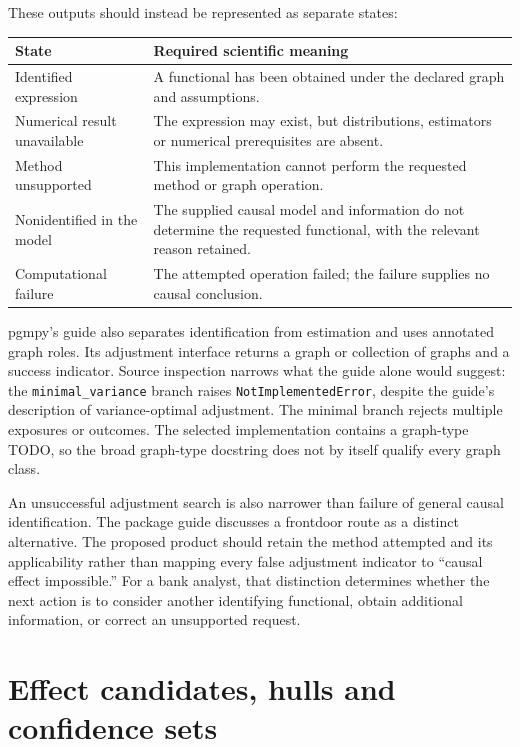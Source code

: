 These outputs should instead be represented as separate states:
\begin{center}
\begin{tabular}{p{}p{}}
\toprule
State & Required scientific meaning\\
\midrule
Identified expression & A functional has been obtained under the declared graph and assumptions.\\
Numerical result unavailable & The expression may exist, but distributions, estimators or numerical prerequisites are absent.\\
Method unsupported & This implementation cannot perform the requested method or graph operation.\\
Nonidentified in the model & The supplied causal model and information do not determine the requested functional, with the relevant reason retained.\\
Computational failure & The attempted operation failed; the failure supplies no causal conclusion.\\
\bottomrule
\end{tabular}
\end{center}

pgmpy's guide also separates identification from estimation and uses annotated
graph roles. Its adjustment interface returns a graph or collection of graphs
and a success indicator. Source inspection narrows what the guide alone would
suggest: the \texttt{minimal\_variance} branch raises
\texttt{NotImplementedError}, despite the guide's description of variance-optimal
adjustment. The minimal branch rejects multiple exposures or outcomes. The
selected implementation contains a graph-type TODO, so the broad graph-type
docstring does not by itself qualify every graph class. \citep{v12_sw_pgmpy}

An unsuccessful adjustment search is also narrower than failure of general
causal identification. The package guide discusses a frontdoor route as a
distinct alternative. The proposed product should retain the method attempted
and its applicability rather than mapping every false adjustment indicator to
``causal effect impossible.'' For a bank analyst, that distinction determines
whether the next action is to consider another identifying functional, obtain
additional information, or correct an unsupported request.

\section{Effect candidates, hulls and confidence sets}


